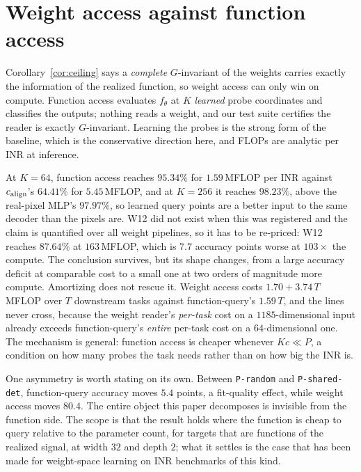 \section{Weight access against function access}\label{sec:function}

Corollary~\ref{cor:ceiling} says a \emph{complete} $G$-invariant of the weights carries exactly the
information of the realized function, so weight access can only win on compute. Function access
evaluates $f_\theta$ at $K$ \emph{learned} probe coordinates and classifies the outputs; nothing
reads a weight, and our test suite certifies the reader is exactly $G$-invariant. Learning the
probes is the strong form of the baseline, which is the conservative direction here, and FLOPs are
analytic per INR at inference.

At $K = 64$, function access reaches $95.34\%$ for $1.59$\,MFLOP per INR against $c_{\mathrm{align}}$'s
$64.41\%$ for $5.45$\,MFLOP, and at $K = 256$ it reaches $98.23\%$, above the real-pixel MLP's
$97.97\%$, so learned query points are a better input to the same decoder than the pixels are. W12
did not exist when this was registered and the claim is quantified over all weight pipelines, so it
has to be re-priced: W12 reaches $87.64\%$ at $163$\,MFLOP, which is $7.7$ accuracy points worse at
$103\times$ the compute. The conclusion survives, but its shape changes, from a large accuracy
deficit at comparable cost to a small one at two orders of magnitude more compute. Amortizing does
not rescue it. Weight access costs $1.70 + 3.74\,T$\,MFLOP over $T$ downstream tasks against
function-query's $1.59\,T$, and the lines never cross, because the weight reader's \emph{per-task}
cost on a $1185$-dimensional input already exceeds function-query's \emph{entire} per-task cost on a
$64$-dimensional one. The mechanism is general: function access is cheaper whenever $Kc \ll P$, a
condition on how many probes the task needs rather than on how big the INR is.

One asymmetry is worth stating on its own. Between \texttt{P-random} and \texttt{P-shared-det},
function-query accuracy moves $5.4$ points, a fit-quality effect, while weight access moves $80.4$.
The entire object this paper decomposes is invisible from the function side. The scope is that the
result holds where the function is cheap to query relative to the parameter count, for targets that
are functions of the realized signal, at width $32$ and depth $2$; what it settles is the case that
has been made for weight-space learning on INR benchmarks of this kind.
